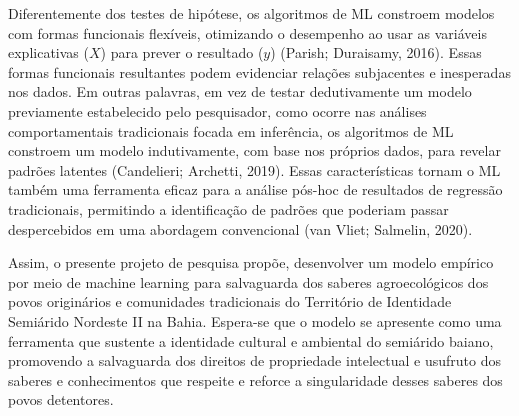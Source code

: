 Diferentemente dos testes de hipótese, os algoritmos de ML constroem modelos com formas funcionais flexíveis, otimizando o desempenho ao usar as variáveis explicativas ($X$) para prever o resultado ($y$) (Parish; Duraisamy, 2016). Essas formas funcionais resultantes podem evidenciar relações subjacentes e inesperadas nos dados.
Em outras palavras, em vez de testar dedutivamente um modelo previamente estabelecido pelo pesquisador, como ocorre nas análises comportamentais tradicionais focada em inferência, os algoritmos de ML constroem um modelo indutivamente, com base nos próprios dados, para revelar padrões latentes (Candelieri; Archetti, 2019). Essas características tornam o ML também uma ferramenta eficaz para a análise pós-hoc de resultados de regressão tradicionais, permitindo a identificação de padrões que poderiam passar despercebidos em uma abordagem convencional (van Vliet; Salmelin, 2020).

Assim, o presente projeto de pesquisa propõe, desenvolver um modelo empírico por meio de machine learning para salvaguarda dos saberes agroecológicos dos povos originários e comunidades tradicionais do Território de Identidade Semiárido Nordeste II na Bahia. Espera-se que o modelo se apresente como uma ferramenta que sustente a identidade cultural e ambiental do semiárido baiano, promovendo a salvaguarda dos direitos de propriedade intelectual e usufruto dos saberes e conhecimentos que respeite e reforce a singularidade desses saberes dos povos detentores.
